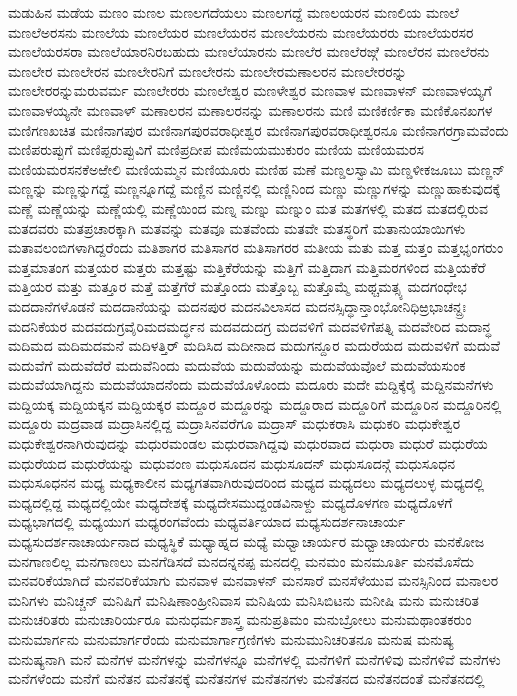{ಮಡುಹಿನ
ಮಡೆಯ
ಮಣಂ
ಮಣಲ
ಮಣಲಗದೆಯಲು
ಮಣಲಗದ್ದೆ
ಮಣಲಯರನ
ಮಣಲಿಯ
ಮಣಲೆ
ಮಣಲೆಅರಸನು
ಮಣಲೆಯ
ಮಣಲೆಯರ
ಮಣಲೆಯರನ
ಮಣಲೆಯರನು
ಮಣಲೆಯರರು
ಮಣಲೆಯರಸರ
ಮಣಲೆಯರಸರಾ
ಮಣಲೆಯಾರನಿರಬಹುದು
ಮಣಲೆಯಾರನು
ಮಣಲೆರ
ಮಣಲೆರಙ್ಗೆ
ಮಣಲೆರನ
ಮಣಲೆರನು
ಮಣಲೇರ
ಮಣಲೇರನ
ಮಣಲೇರನಿಗೆ
ಮಣಲೇರನು
ಮಣಲೇರಮಣಾಲರನ
ಮಣಲೇರರನ್ನು
ಮಣಲೇರರನ್ನುಮರುವರ್ಮ
ಮಣಲೇರರು
ಮಣಲೇಶ್ವರ
ಮಣಳೇಶ್ವರ
ಮಣವಾಳ
ಮಣವಾಳನ್
ಮಣವಾಳಯ್ಯಗೆ
ಮಣವಾಳಯ್ಯನೇ
ಮಣವಾಳ್
ಮಣಾಲರನ
ಮಣಾಲರನನ್ನು
ಮಣಾಲರನು
ಮಣಿ
ಮಣಿಕರ್ಣಿಕಾ
ಮಣಿಕೊನಖಗಳ
ಮಣಿಗಣಖಚಿತ
ಮಣಿನಾಗಪುರ
ಮಣಿನಾಗಪುರವರಾಧೀಶ್ವರ
ಮಣಿನಾಗಪುರವರಾಧೀಶ್ವರನೂ
ಮಣಿನಾಗರಗ್ರಾಮವೆಂದು
ಮಣಿಪರುಪ್ಪುಗೆ
ಮಣಿಪ್ಪರುಪ್ಪುವಿಗೆ
ಮಣಿಪ್ರದೀಪ
ಮಣಿಮಯಮುಕುರಂ
ಮಣಿಯ
ಮಣಿಯಮರಸ
ಮಣಿಯಮರಸನಕೆಅಱೇಲಿ
ಮಣಿಯಮ್ಮನ
ಮಣಿಯೂರು
ಮಣಿಹ
ಮಣೆ
ಮಣ್ಡಲಸ್ವಾಮಿ
ಮಣ್ಡಳೀಕಜೂಬು
ಮಣ್ಣನ್
ಮಣ್ಣನ್ನು
ಮಣ್ಣನ್ನುಗದ್ದೆ
ಮಣ್ಣನ್ನೂಗದ್ದೆ
ಮಣ್ಣಿನ
ಮಣ್ಣಿನಲ್ಲಿ
ಮಣ್ಣಿನಿಂದ
ಮಣ್ಣು
ಮಣ್ಣುಗಳನ್ನು
ಮಣ್ಣುಹಾಕುವುದಕ್ಕೆ
ಮಣ್ಣೆ
ಮಣ್ಣೆಯನ್ನು
ಮಣ್ಣೆಯಲ್ಲಿ
ಮಣ್ಣೆಯಿಂದ
ಮಣ್ನ
ಮಣ್ನು
ಮಣ್ನುಂ
ಮತ
ಮತಗಳಲ್ಲಿ
ಮತದ
ಮತದಲ್ಲಿರುವ
ಮತದವರು
ಮತಪ್ರಚಾರಕ್ಕಾಗಿ
ಮತವನ್ನು
ಮತವೂ
ಮತವೆಂದು
ಮತವೇ
ಮತಸ್ಥರಿಗೆ
ಮತಾನುಯಾಯಿಗಳು
ಮತಾವಲಂಬಿಗಳಾಗಿದ್ದರೆಂದು
ಮತಿಶಾಗರ
ಮತಿಸಾಗರ
ಮತಿಸಾಗರರ
ಮತೀಯ
ಮತು
ಮತ್ತ
ಮತ್ತಂ
ಮತ್ತಭೃಂಗರುಂ
ಮತ್ತಮಾತಂಗ
ಮತ್ತಯರ
ಮತ್ತರು
ಮತ್ತಷ್ಟು
ಮತ್ತಿಕೆರೆಯನ್ನು
ಮತ್ತಿಗೆ
ಮತ್ತಿದಾಗ
ಮತ್ತಿಮರಗಳಿಂದ
ಮತ್ತಿಯಕೆರೆ
ಮತ್ತಿಯರ
ಮತ್ತು
ಮತ್ತೂರ
ಮತ್ತೆ
ಮತ್ತೆಗೆರೆ
ಮತ್ತೊಂದು
ಮತ್ತೊಬ್ಬ
ಮತ್ತೊಮ್ಮೆ
ಮಥ್ಚಮತ್ಸ್ಯ
ಮದಗಂಧೇಭ
ಮದದಾನೆಗಳೊಡನೆ
ಮದದಾನೆಯನ್ನು
ಮದನಪುರ
ಮದನವಿಲಾಸದ
ಮದನಸ್ಸಿದ್ಧಾನ್ತಾಂಭೋನಿಧಿಱ್ರಭಾಚನ್ದ್ರಃ
ಮದನಿಕೆಯರ
ಮದವದುಗ್ರವೈರಿಮದಮರ್ದ್ಧನ
ಮದವದುದಗ್ರ
ಮದವಳಿಗೆ
ಮದವಳಿಗೆಪತ್ನಿ
ಮದವೇರಿದ
ಮದಾನ್ಧ
ಮದಿಮದ
ಮದಿಮದಮನೆ
ಮದಿಳತ್ತಿರ್
ಮದಿಸಿದ
ಮದೀನಾದ
ಮದುಗನ್ದೂರ
ಮದುರೆಯದ
ಮದುವಳಿಗೆ
ಮದುವೆ
ಮದುವೆಗೆ
ಮದುವೆದೆರೆ
ಮದುವೆನಿಂದು
ಮದುವೆಯ
ಮದುವೆಯನ್ನು
ಮದುವೆಯವೊಲೆ
ಮದುವೆಯಸುಂಕ
ಮದುವೆಯಾಗಿದ್ದನು
ಮದುವೆಯಾದನೆಂದು
ಮದುವೆಯೊಳೊಂದು
ಮದೂರು
ಮದೇ
ಮದ್ದಿಕ್ಕೆರೈ
ಮದ್ದಿನಮನೆಗಳು
ಮದ್ದಿಯಕ್ಕ
ಮದ್ದಿಯಕ್ಕನ
ಮದ್ದಿಯಕ್ಕರ
ಮದ್ದೂರ
ಮದ್ದೂರನ್ನು
ಮದ್ದೂರಾದ
ಮದ್ದೂರಿಗೆ
ಮದ್ದೂರಿನ
ಮದ್ದೂರಿನಲ್ಲಿ
ಮದ್ದೂರು
ಮದ್ರವಾಡ
ಮದ್ರಾಸಿನಲ್ಲಿದ್ದ
ಮದ್ರಾಸಿನವರೆಗೂ
ಮದ್ರಾಸ್
ಮಧುಕರಾಸಿ
ಮಧುಕರಿ
ಮಧುಕೇಶ್ವರ
ಮಧುಕೇಶ್ವರನಾಗಿರುವುದನ್ನು
ಮಧುರಮಂಡಲ
ಮಧುರವಾಗಿದ್ದವು
ಮಧುರವಾದ
ಮಧುರಾ
ಮಧುರೆ
ಮಧುರೆಯ
ಮಧುರೆಯದ
ಮಧುರೆಯನ್ನು
ಮಧುವಂಣ
ಮಧುಸೂದನ
ಮಧುಸೂದನ್
ಮಧುಸೂದನ್ಗೆ
ಮಧುಸೂಧನ
ಮಧುಸೂಧನನ
ಮಧ್ಯ
ಮಧ್ಯಕಾಲೀನ
ಮಧ್ಯಗತವಾಗಿರುವುದರಿಂದ
ಮಧ್ಯದ
ಮಧ್ಯದಲು
ಮಧ್ಯದಲುಳ್ಳ
ಮಧ್ಯದಲ್ಲಿ
ಮಧ್ಯದಲ್ಲಿದ್ದ
ಮಧ್ಯದಲ್ಲಿಯೇ
ಮಧ್ಯದೇಶಕ್ಕೆ
ಮಧ್ಯದೇಸಮುದ್ದಂಡವಿನಾಳ್ದು
ಮಧ್ಯದೊಳಗಣ
ಮಧ್ಯದೊಳಗೆ
ಮಧ್ಯಭಾಗದಲ್ಲಿ
ಮಧ್ಯಯುಗ
ಮಧ್ಯರಂಗವೆಂದು
ಮಧ್ಯವರ್ತಿಯಾದ
ಮಧ್ಯಸುದರ್ಶನಾಚಾರ್ಯ
ಮಧ್ಯಸುದರ್ಶನಾಚಾರ್ಯನಾದ
ಮಧ್ಯಸ್ಥಿಕೆ
ಮಧ್ಯಾಹ್ನದ
ಮಧ್ಯೆ
ಮಧ್ವಾಚಾರ್ಯರ
ಮಧ್ವಾಚಾರ್ಯರು
ಮನಕೋಜ
ಮನಗಾಣಲಿಲ್ಲ
ಮನಗಾಣಲು
ಮನಗೆಡಿಸದೆ
ಮನದನ್ನನಪ್ಪ
ಮನದಲ್ಲಿ
ಮನಮಂ
ಮನಮೂರ್ತಿ
ಮನಮೊಸೆದು
ಮನವರಿಕೆಯಾಗಿದೆ
ಮನವರಿಕೆಯಾಗು
ಮನವಾಳ
ಮನವಾಳನ್
ಮನಸಾರೆ
ಮನಸೆಳೆಯುವ
ಮನಸ್ಸಿನಿಂದ
ಮನಾಲರ
ಮನಿಗಳು
ಮನಿಚ್ಚನ್
ಮನಿಷಿಗೆ
ಮನಿಷಿಣಾಂಹ್ರೀನಿವಾಸ
ಮನಿಷಿಯ
ಮನಿಸಿಬಿಟನು
ಮನೀಷಿ
ಮನು
ಮನುಚರಿತ
ಮನುಚರಿತರು
ಮನುಚಾರಿರ್ಯರೂ
ಮನುಧರ್ಮಶಾಸ್ತ್ರ
ಮನುಪ್ರತಿಮಂ
ಮನುಬ್ರೋಲು
ಮನುಮಥಾಂತಕರುಂ
ಮನುಮಾರ್ಗನು
ಮನುಮಾರ್ಗರೆಂದು
ಮನುಮಾರ್ಗಾಗ್ರಣಿಗಳು
ಮನುಮುನಿಚರಿತನೂ
ಮನುಷ
ಮನುಷ್ಯ
ಮನುಷ್ಯನಾಗಿ
ಮನೆ
ಮನೆಗಳ
ಮನೆಗಳನ್ನು
ಮನೆಗಳನ್ನೂ
ಮನೆಗಳಲ್ಲಿ
ಮನೆಗಳಿಗೆ
ಮನೆಗಳಿವು
ಮನೆಗಳಿವೆ
ಮನೆಗಳು
ಮನೆಗಳೆಂದು
ಮನೆಗೆ
ಮನೆತನ
ಮನೆತನಕ್ಕೆ
ಮನೆತನಗಳ
ಮನೆತನಗಳು
ಮನೆತನದ
ಮನೆತನದಂತೆ
ಮನೆತನದಲ್ಲಿ
}
